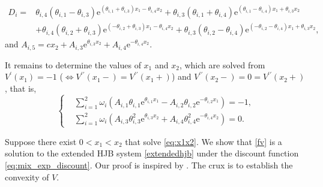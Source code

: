 \documentclass[11pt,reqno]{article}%
\numberwithin{equation}{section}
\begin{document}
\begin{equation}\nonumber\begin{aligned}
D_i=&\theta_{i,4}(\theta_{i,1} - \theta_{i,3}) \mathrm{e}^{(\theta_{i,1}+\theta_{i,3}) x_1 - \theta_{i,4} x_2}  + \theta_{i,3}(\theta_{i,1}+\theta_{i,4})  \mathrm{e}^{(\theta_{i,1} - \theta_{i,4}) x_1 + \theta_{i,3} x_2}  \\
&+\theta_{i,4}(\theta_{i,2} + \theta_{i,3})\mathrm{e}^{(-\theta_{i,2}+\theta_{i,3} ) x_1 - \theta_{i,4} x_2} +\theta_{i,3}(\theta_{i,2} - \theta_{i,4})  \mathrm{e}^{(-\theta_{i,2}-\theta_{i,4}) x_1 + \theta_{i,3} x_2},	
\end{aligned}\end{equation}
and $A_{i,5}=cx_2+A_{i,3} \mathrm{e}^{\theta_{i,3}x_2} + A_{i,4} \mathrm{e}^{-\theta_{i,4}x_2}$.

It remains to determine the values of $x_1$ and $x_2$, which are solved from $V^\prime(x_1) = -1$ ($\Leftrightarrow V^{\prime\prime}(x_1-)=V^{\prime\prime}(x_1+)$) and $V^{\prime\prime}(x_2-) = 0=V^{\prime\prime}(x_2+)$, that is,
\begin{equation}\label{eq:x1x2}
\left\{\begin{aligned}
& \sum\limits_{i=1}^{2}\omega_i \left(A_{i,1} \theta_{i,1} \mathrm{e}^{\theta_{i,1}x_1} - A_{i,2} \theta_{i,2} \mathrm{e}^{-\theta_{i,2}x_1}\right)=-1,\\
& \sum\limits_{i=1}^{2}\omega_i\left(A_{i,3}\theta_{i,3}^2 \mathrm{e}^{\theta_{i,3}x_2} + A_{i,4} \theta_{i,4}^2\mathrm{e}^{-\theta_{i,4}x_2}\right) = 0.
\end{aligned}\right.
\end{equation}

Suppose there exist  $0 < x_1 < x_2$ that solve \eqref{eq:x1x2}. We show that \eqref{fv} is a solution to the extended HJB system \eqref{extendedhjb} under the discount function \eqref{eq:mix_exp_discount}. Our proof is inspired by \citet{hu2025equilibrium}. The crux is to establish the convexity of $V$.
\end{document}
